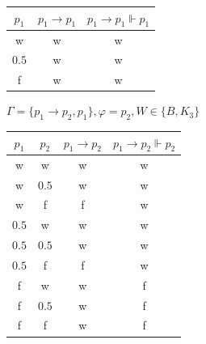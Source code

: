 \documentclass[10pt, a4paper]{exam}
\begin{document}
\begin{questions}
\begin{parts}
\begin{subparts}
            \begin{solution}

                \begin{tabular}{c|c|c}
                    $p_1$ & $p_1\rightarrow p_1$ & $p_1\rightarrow p_1 \Vdash p_1$ \\\hline
                    w     & w                    & w                               \\
                    $0.5$ & w                    & w                               \\
                    f     & w                    & w                               \\
                \end{tabular}
            \end{solution}

            \subpart $\Gamma=\{p_1\rightarrow p_2, p_1\}, \varphi=p_2, W\in\{B,K_3\}$
            \begin{solution}

                \begin{tabular}{c | c | c | c}
                    $p_1$ & $p_2$ & $p_1\rightarrow p_2$ & $p_1\rightarrow p_2\Vdash p_2$ \\\hline
                    w     & w     & w                    & w                              \\
                    w     & $0.5$ & w                    & w                              \\
                    w     & f     & f                    & w                              \\
                    $0.5$ & w     & w                    & w                              \\
                    $0.5$ & $0.5$ & w                    & w                              \\
                    $0.5$ & f     & f                    & w                              \\
                    f     & w     & w                    & f                              \\
                    f     & $0.5$ & w                    & f                              \\
                    f     & f     & w                    & f                              \\
                \end{tabular}
            \end{solution}


\end{subparts}
\end{parts}
\end{questions}
\end{document}
